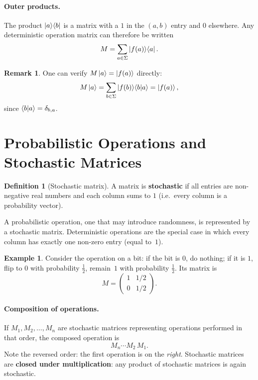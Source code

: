 \documentclass[11pt]{article}
\theoremstyle{definition}
\newtheorem{definition}{Definition}[section]
\newtheorem{example}{Example}[section]
\newtheorem{remark}{Remark}[section]
\begin{document}
\paragraph{Outer products.}
The product $\ket{a}\!\bra{b}$ is a matrix with a $1$ in the $(a,b)$ entry and $0$ elsewhere.  Any deterministic operation matrix can therefore be written
\[
    M = \sum_{a\in\Sigma} \ket{f(a)}\!\bra{a}.
\]

\begin{remark}
One can verify $M\ket{a}=\ket{f(a)}$ directly:
\[
    M\ket{a} = \sum_{b\in\Sigma}\ket{f(b)}\!\braket{b}{a} = \ket{f(a)},
\]
since $\braket{b}{a}=\delta_{b,a}$.
\end{remark}

\section{Probabilistic Operations and Stochastic Matrices}

\begin{definition}[Stochastic matrix]
A matrix is \textbf{stochastic} if all entries are non-negative real numbers and each column sums to $1$ (i.e.\ every column is a probability vector).
\end{definition}

A probabilistic operation, one that may introduce randomness, is represented by a stochastic matrix.  Deterministic operations are the special case in which every column has exactly one non-zero entry (equal to~$1$).

\begin{example}
Consider the operation on a bit: if the bit is $0$, do nothing; if it is $1$, flip to $0$ with probability $\tfrac{1}{2}$, remain~$1$ with probability $\tfrac{1}{2}$.  Its matrix is
\[
    M = \begin{pmatrix}1 & 1/2 \\ 0 & 1/2\end{pmatrix}.
\]
\end{example}

\paragraph{Composition of operations.}
If $M_1,M_2,\dots,M_n$ are stochastic matrices representing operations performed in that order, the composed operation is
\[
    M_n \cdots M_2 \, M_1.
\]
Note the reversed order: the first operation is on the \emph{right}.  Stochastic matrices are \textbf{closed under multiplication}: any product of stochastic matrices is again stochastic.
\end{document}
